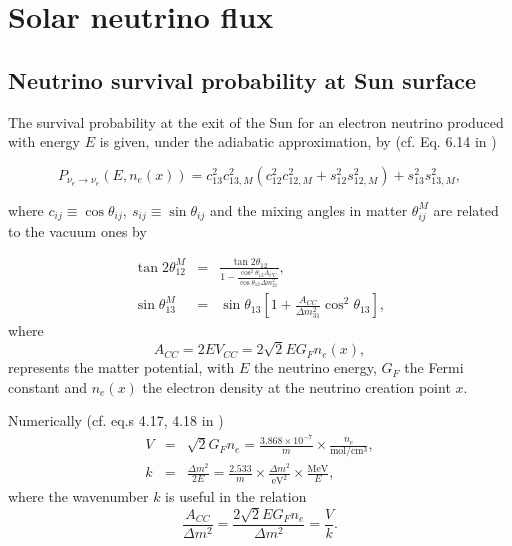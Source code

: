 \documentclass{article}
\newcommand{\MeV}[0]{\text{MeV}}
\begin{document}
\section{Solar neutrino flux}
	\subsection{Neutrino survival probability at Sun surface}
	
	The survival probability at the exit of the Sun for an electron neutrino produced with energy $E$ is given, under the adiabatic approximation, by (cf. Eq. 6.14 in \cite{FiuzadeBarros:2011qna})
	
	\begin{equation}
		P_{\nu_e \rightarrow \nu_e}(E, n_e(x)) = c_{13}^2 c_{13,M}^2 \left( c_{12}^2 c_{12,M}^2 + s_{12}^2 s_{12,M}^2 \right) + s_{13}^2 s_{13,M}^2,
	\end{equation}
	
where $c_{ij} \equiv \cos \theta_{ij},\ s_{ij} \equiv \sin \theta_{ij}$ and the mixing angles in matter $\theta_{ij}^M$ are related to the vacuum ones by

\begin{eqnarray}
	\tan 2 \theta_{12}^M &=& \frac{\tan 2 \theta_{12}}{1-\frac{\cos^2 \theta_{13} A_{CC}}{\cos \theta_{12} \Delta m^2_{21}} },\\
	\sin \theta_{13}^M &=& \sin \theta_{13} \left[1 + \frac{A_{CC}}{\Delta m^2_{31}} \cos^2\theta_{13}\right],
\end{eqnarray}
where
\begin{equation}
	A_{CC} = 2 E V_{CC} = 2 \sqrt{2} E G_F n_e(x),
\end{equation}
represents the matter potential, with $E$ the neutrino energy, $G_F$ the Fermi constant and $n_e(x)$ the electron density at the neutrino creation point $x$.

Numerically (cf. eq.s 4.17, 4.18 in \cite{Fantini:2018itu})
\begin{eqnarray}
	V &=& \sqrt{2} G_F n_e = \frac{3.868 \times 10^{-7}}{m} \times \frac{n_e}{\text{mol}/\text{cm}^3},\\
	k &=& \frac{\Delta m^2}{2 E} = \frac{2.533}{m} \times \frac{\Delta m^2}{\text{eV}^2} \times \frac{\MeV}{E},
\end{eqnarray}
where the wavenumber $k$ is useful in the relation
\begin{equation}
	\frac{A_{CC}}{\Delta m^2} = \frac{2 \sqrt{2} E G_F n_e}{\Delta m^2} = \frac{V}{k}.
\end{equation}
\end{document}
